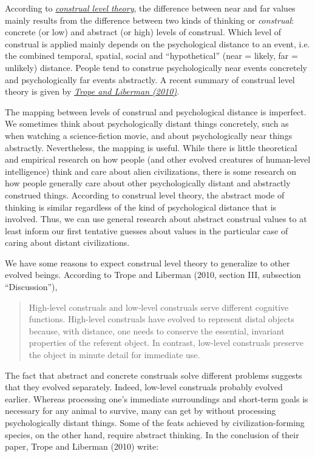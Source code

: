 According to
\href{https://en.wikipedia.org/wiki/Construal_level_theory}{\emph{\emph{construal
level theory}}}, the difference between near and far values mainly
results from the difference between two kinds of thinking or
\emph{construal}: concrete (or low) and abstract (or high) levels of
construal. Which level of construal is applied mainly depends on the
psychological distance to an event, i.e. the combined temporal, spatial,
social and ``hypothetical'' (near = likely, far = unlikely) distance.
People tend to construe psychologically near events concretely and
psychologically far events abstractly. A recent summary of construal
level theory is given by
\href{http://www.psych.nyu.edu/trope/Trope_Liberman_2010.pdf}{\emph{Trope
and Liberman (2010)}}.

The mapping between levels of construal and psychological distance is
imperfect. We sometimes think about psychologically distant things
concretely, such as when watching a science-fiction movie, and about
psychologically near things abstractly. Nevertheless, the mapping is
useful. While there is little theoretical and empirical research on how
people (and other evolved creatures of human-level intelligence) think
and care about alien civilizations, there is some research on how people
generally care about other psychologically distant and abstractly
construed things. According to construal level theory, the abstract mode
of thinking is similar regardless of the kind of psychological distance
that is involved. Thus, we can use general research about abstract
construal values to at least inform our first tentative guesses about
values in the particular case of caring about distant civilizations.

We have some reasons to expect construal level theory to generalize to
other evolved beings. According to Trope and Liberman (2010, section
III, subsection ``Discussion''),

\begin{quote}
High-level construals and low-level construals serve different cognitive
functions. High-level construals have evolved to represent distal
objects because, with distance, one needs to conserve the essential,
invariant properties of the referent object. In contrast, low-level
construals preserve the object in minute detail for immediate use.
\end{quote}

The fact that abstract and concrete construals solve different problems
suggests that they evolved separately. Indeed, low-level construals
probably evolved earlier. Whereas processing one's immediate
surroundings and short-term goals is necessary for any animal to
survive, many can get by without processing psychologically distant
things. Some of the feats achieved by civilization-forming species, on
the other hand, require abstract thinking. In the conclusion of their
paper, Trope and Liberman (2010) write:

